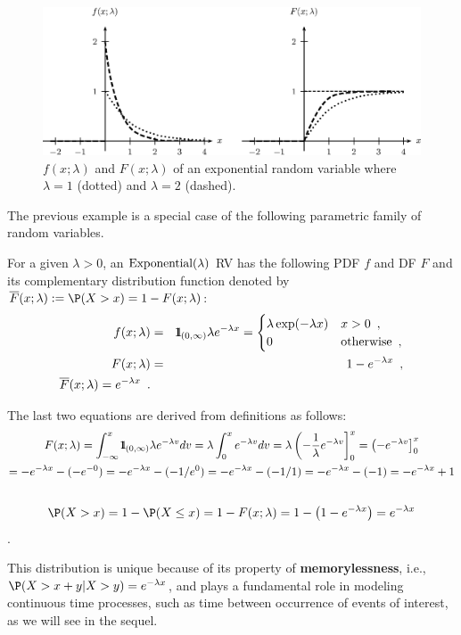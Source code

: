 \begin{figure}[htbp]
\begin{center}
\includegraphics[width=5.0in]{pstricks/exponentialLambdafF}
\caption{$f(x;\lambda)$ and $F(x;\lambda)$ of an exponential random variable where $\lambda=1$ (dotted) and $\lambda=2$ (dashed).}
\end{center}
\end{figure}


The previous example is a special case of the following parametric
family of random variables.

\begin{model}[$\exponential(\lambda)$]\label{M:exponential}
For a given $\lambda > 0$, an $\exponential(\lambda)$ RV has the following PDF $f$ and DF $F$ and its complementary distribution function denoted by $\overline{F}(x; \lambda) := \P(X > x) = 1-F(x;\lambda)$:
\begin{eqnarray}\label{E:Exponentialpdfcdf}
f(x; \lambda) &=& {1}\mspace{-11 mu}{1}_{(0,\infty)} \lambda e^{-\lambda x} =
\begin{cases}
\lambda \exp(-\lambda x) & x>0 \enspace ,\\
0&\textrm{otherwise} \enspace ,
\end{cases}\\
F(x; \lambda) &=& 1-e^{-\lambda x} \enspace ,\\ 
\overline{F}(x; \lambda) = e^{-\lambda x} \enspace .
\end{eqnarray}

The last two equations are derived from definitions as follows:
\begin{multline*}
F(x; \lambda) = \int_{-\infty}^{x} {1}\mspace{-11 mu}{1}_{(0,\infty)} \lambda e^{-\lambda v} dv = \lambda \int_0^x e^{-\lambda v} dv = \lambda \left( -\frac{1}{\lambda} e^{-\lambda v} \right]_0^x =  \left( - e^{-\lambda v} \right]_0^x \\ \notag
= -e^{-\lambda x} - (-e^{-0}) = -e^{-\lambda x} - (-1/e^0) = -e^{-\lambda x} - (-1/1) = -e^{-\lambda x} - (-1) = -e^{-\lambda x} + 1 \\ \notag
\end{multline*}
\[\P(X > x) = 1- \P(X \leq x) = 1- F(x; \lambda) = 1 - \left( 1-e^{-\lambda x}\right) = e^{-\lambda x}\].

This distribution is unique because of its property of {\bf memorylessness}, i.e., $\P(X>x+y | X > y) = e^{-\lambda x}$, and plays a fundamental role in modeling continuous time processes, such as time between occurrence of events of interest, as we will see in the sequel.
\end{model}


